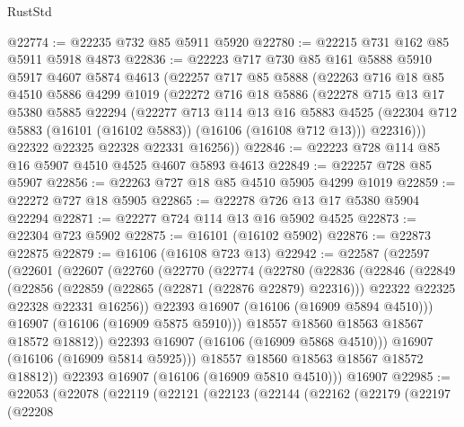 \begin{lexlean}{RustStd}
\begin{coremodule}
@22774 := @22235 @732 @85 @5911 @5920
@22780 := @22215 @731 @162 @85 @5911 @5918 @4873
@22836 := @22223
    @717
    @730
    @85
    @161
    @5888
    @5910
    @5917
    @4607
    @5874
    @4613
    (@22257
      @717
      @85
      @5888
      (@22263
        @716
        @18
        @85
        @4510
        @5886
        @4299
        @1019
        (@22272
          @716
          @18
          @5886
          (@22278
            @715
            @13
            @17
            @5380
            @5885
            @22294
            (@22277
              @713
              @114
              @13
              @16
              @5883
              @4525
              (@22304 @712 @5883 (@16101 (@16102 @5883)) (@16106 (@16108 @712 @13)))
              @22316)))
        @22322
        @22325
        @22328
        @22331
        @16256))
@22846 := @22223 @728 @114 @85 @16 @5907 @4510 @4525 @4607 @5893 @4613
@22849 := @22257 @728 @85 @5907
@22856 := @22263 @727 @18 @85 @4510 @5905 @4299 @1019
@22859 := @22272 @727 @18 @5905
@22865 := @22278 @726 @13 @17 @5380 @5904 @22294
@22871 := @22277 @724 @114 @13 @16 @5902 @4525
@22873 := @22304 @723 @5902
@22875 := @16101 (@16102 @5902)
@22876 := @22873 @22875
@22879 := @16106 (@16108 @723 @13)
@22942 := @22587
    (@22597
      (@22601
        (@22607
          (@22760
            (@22770
              (@22774
                (@22780
                  (@22836
                    (@22846
                      (@22849
                        (@22856
                          (@22859 (@22865 (@22871 (@22876 @22879) @22316)))
                          @22322
                          @22325
                          @22328
                          @22331
                          @16256))
                      @22393
                      @16907
                      (@16106 (@16909 @5894 @4510)))
                    @16907
                    (@16106 (@16909 @5875 @5910)))
                  @18557
                  @18560
                  @18563
                  @18567
                  @18572
                  @18812))
              @22393
              @16907
              (@16106 (@16909 @5868 @4510)))
            @16907
            (@16106 (@16909 @5814 @5925)))
          @18557
          @18560
          @18563
          @18567
          @18572
          @18812))
      @22393
      @16907
      (@16106 (@16909 @5810 @4510)))
    @16907
@22985 := @22053
    (@22078
      (@22119
        (@22121
          (@22123
            (@22144
              (@22162
                (@22179
                  (@22197
                    (@22208

\end{coremodule}
\end{lexlean}
